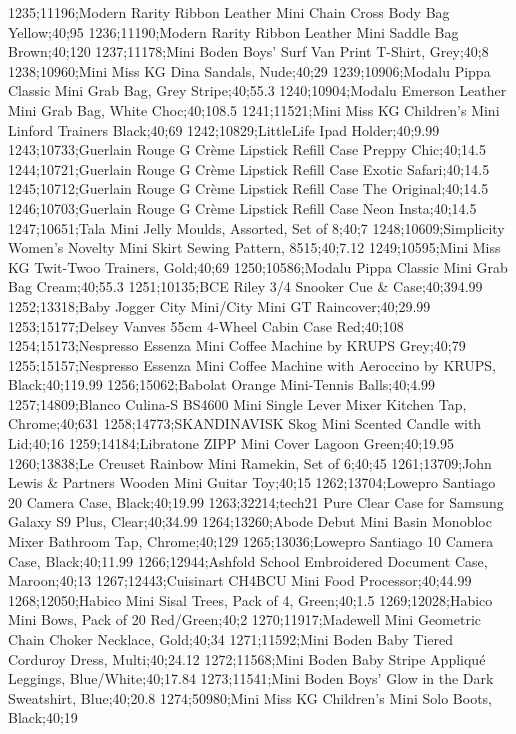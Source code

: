 1235;11196;Modern Rarity Ribbon Leather Mini Chain Cross Body Bag Yellow;40;95
1236;11190;Modern Rarity Ribbon Leather Mini Saddle Bag Brown;40;120
1237;11178;Mini Boden Boys' Surf Van Print T-Shirt, Grey;40;8
1238;10960;Mini Miss KG Dina Sandals, Nude;40;29
1239;10906;Modalu Pippa Classic Mini Grab Bag, Grey Stripe;40;55.3
1240;10904;Modalu Emerson Leather Mini Grab Bag, White Choc;40;108.5
1241;11521;Mini Miss KG Children's Mini Linford Trainers Black;40;69
1242;10829;LittleLife Ipad Holder;40;9.99
1243;10733;Guerlain Rouge G Crème Lipstick Refill Case Preppy Chic;40;14.5
1244;10721;Guerlain Rouge G Crème Lipstick Refill Case Exotic Safari;40;14.5
1245;10712;Guerlain Rouge G Crème Lipstick Refill Case The Original;40;14.5
1246;10703;Guerlain Rouge G Crème Lipstick Refill Case Neon Insta;40;14.5
1247;10651;Tala Mini Jelly Moulds, Assorted, Set of 8;40;7
1248;10609;Simplicity Women's Novelty Mini Skirt Sewing Pattern, 8515;40;7.12
1249;10595;Mini Miss KG Twit-Twoo Trainers, Gold;40;69
1250;10586;Modalu Pippa Classic Mini Grab Bag Cream;40;55.3
1251;10135;BCE Riley 3/4 Snooker Cue & Case;40;394.99
1252;13318;Baby Jogger City Mini/City Mini GT Raincover;40;29.99
1253;15177;Delsey Vanves 55cm 4-Wheel Cabin Case Red;40;108
1254;15173;Nespresso Essenza Mini Coffee Machine by KRUPS Grey;40;79
1255;15157;Nespresso Essenza Mini Coffee Machine with Aeroccino by KRUPS, Black;40;119.99
1256;15062;Babolat Orange Mini-Tennis Balls;40;4.99
1257;14809;Blanco Culina-S BS4600 Mini Single Lever Mixer Kitchen Tap, Chrome;40;631
1258;14773;SKANDINAVISK Skog Mini Scented Candle with Lid;40;16
1259;14184;Libratone ZIPP Mini Cover Lagoon Green;40;19.95
1260;13838;Le Creuset Rainbow Mini Ramekin, Set of 6;40;45
1261;13709;John Lewis & Partners Wooden Mini Guitar Toy;40;15
1262;13704;Lowepro Santiago 20 Camera Case, Black;40;19.99
1263;32214;tech21 Pure Clear Case for Samsung Galaxy S9 Plus, Clear;40;34.99
1264;13260;Abode Debut Mini Basin Monobloc Mixer Bathroom Tap, Chrome;40;129
1265;13036;Lowepro Santiago 10 Camera Case, Black;40;11.99
1266;12944;Ashfold School Embroidered Document Case, Maroon;40;13
1267;12443;Cuisinart CH4BCU Mini Food Processor;40;44.99
1268;12050;Habico Mini Sisal Trees, Pack of 4, Green;40;1.5
1269;12028;Habico Mini Bows, Pack of 20 Red/Green;40;2
1270;11917;Madewell Mini Geometric Chain Choker Necklace, Gold;40;34
1271;11592;Mini Boden Baby Tiered Corduroy Dress, Multi;40;24.12
1272;11568;Mini Boden Baby Stripe Appliqué Leggings, Blue/White;40;17.84
1273;11541;Mini Boden Boys' Glow in the Dark Sweatshirt, Blue;40;20.8
1274;50980;Mini Miss KG Children's Mini Solo Boots, Black;40;19

